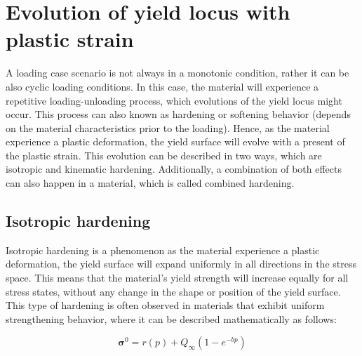 \documentclass[12pt]{article}
\begin{document}
\section{Evolution of yield locus with plastic strain}

\hspace{2em}A loading case scenario is not always in a monotonic condition, 
rather it can be also cyclic loading conditions. In this case,
the material will experience a repetitive loading-unloading process, which evolutions of the yield locus might occur. This process can also 
known as hardening or softening behavior (depends on the material characteristics prior to the loading). Hence, as the material
experience a plastic deformation, the yield surface will evolve with a present of the plastic strain. This 
evolution can be described in two ways, which are isotropic and kinematic hardening. Additionally, a combination of 
both effects can also happen in a material, which is called combined hardening.

\subsection{Isotropic hardening}

\hspace{2em}Isotropic hardening is a phenomenon as the material experience a plastic deformation,
the yield surface will expand uniformly in all directions in the stress space. This means that the material's
yield strength will increase equally for all stress states, without any change in the shape or position
of the yield surface. This type of hardening is often observed in materials that exhibit uniform
strengthening behavior, where it can be described mathematically as follows:

\begin{equation}
    \boldsymbol{\sigma}^0 = r(p) + Q_\infty(1 - e^{-bp})
\end{equation}
\end{document}
